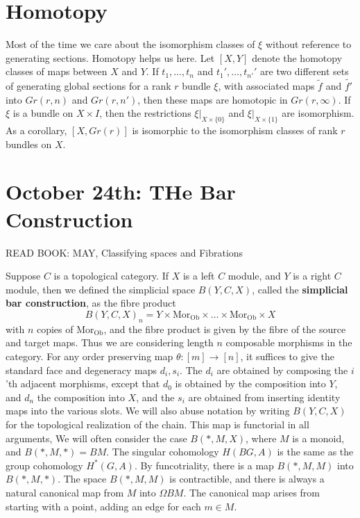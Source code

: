 \section{Homotopy}

Most of the time we care about the isomorphism classes of $\xi$ without reference to generating sections. Homotopy helps us here.  Let $[X,Y]$ denote the homotopy classes of maps between $X$ and $Y$. If $t_1, \dots, t_n$ and $t_1', \dots, t_{n'}'$ are two different sets of generating global sections for a rank $r$ bundle $\xi$, with associated maps $\tilde{f}$ and $\tilde{f'}$ into $Gr(r,n)$ and $Gr(r,n')$, then these maps are homotopic in $Gr(r,\infty)$. If $\xi$ is a bundle on $X \times I$, then the restrictions $\xi|_{X \times \{ 0 \}}$ and $\xi|_{X \times \{ 1 \}}$ are isomorphism. As a corollary, $[X,Gr(r)]$ is isomorphic to the isomorphism classes of rank $r$ bundles on $X$.

\section{October 24th: THe Bar Construction}

READ BOOK: MAY, Classifying spaces and Fibrations

Suppose $C$ is a topological category. If $X$ is a left $C$ module, and $Y$ is a right $C$ module, then we defined the simplicial space $B(Y,C,X)$, called the {\bf simplicial bar construction}, as the fibre product
%
\[ B(Y,C,X)_n = Y \times \text{Mor}_{\text{Ob}} \times \dots \times \text{Mor}_{\text{Ob}} \times X \]
%
with $n$ copies of $\text{Mor}_{\text{Ob}}$, and the fibre product is given by the fibre of the source and target maps. Thus we are considering length $n$ composable morphisms in the category. For any order preserving map $\theta: [m] \to [n]$, it suffices to give the standard face and degeneracy maps $d_i, s_i$. The $d_i$ are obtained by composing the $i$'th adjacent morphisms, except that $d_0$ is obtained by the composition into $Y$, and $d_n$ the composition into $X$, and the $s_i$ are obtained from inserting identity maps into the various slots. We will also abuse notation by writing $B(Y,C,X)$ for the topological realization of the chain. This map is functorial in all arguments, We will often consider the case $B(*,M,X)$, where $M$ is a monoid, and $B(*,M,*) = BM$. The singular cohomology $H(BG,A)$ is the same as the group cohomology $H^*(G,A)$. By funcotriality, there is a map $B(*,M,M)$ into $B(*,M,*)$. The space $B(*,M,M)$ is contractible, and there is always a natural canonical map from $M$ into $\Omega BM$. The canonical map arises from starting with a point, adding an edge for each $m \in M$.

